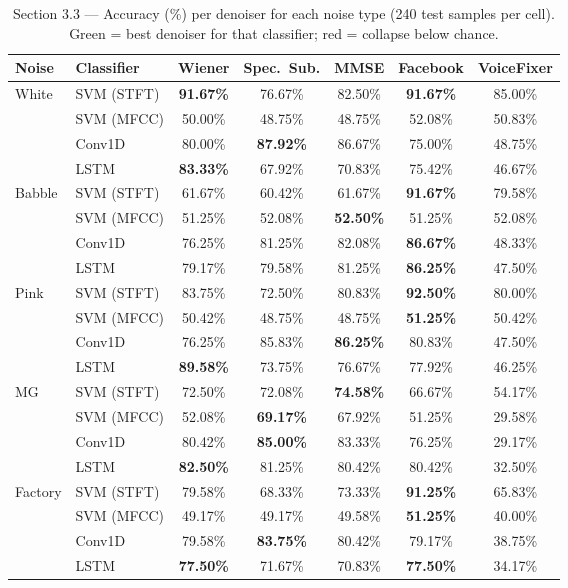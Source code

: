 \documentclass[12pt,a4paper,onecolumn]{exam}
\newcommand{\best}[1]{\cellcolor{bestcol}\textbf{#1}}
\newcommand{\bad}[1]{\cellcolor{warnred}#1}
\begin{document}
\begin{table}[H]
\centering
\caption{Section 3.3 --- Accuracy (\%) per denoiser for each noise type (240 test samples per cell).
Green = best denoiser for that classifier; red = collapse below chance.}
\label{tab:33_acc}
\small
\setlength{\tabcolsep}{5pt}
\begin{tabular}{llccccc}
\toprule
\textbf{Noise} & \textbf{Classifier} & \textbf{Wiener} & \textbf{Spec.\ Sub.} & \textbf{MMSE} & \textbf{Facebook} & \textbf{VoiceFixer} \\
\midrule
\multirow{4}{*}{White}
 & SVM (STFT) & \best{91.67\%} & 76.67\% & 82.50\% & \best{91.67\%} & 85.00\% \\
 & SVM (MFCC) & 50.00\%        & 48.75\% & 48.75\% & 52.08\% & 50.83\% \\
 & Conv1D     & 80.00\%        & \best{87.92\%} & 86.67\% & 75.00\% & \bad{48.75\%} \\
 & LSTM       & \best{83.33\%} & 67.92\% & 70.83\% & 75.42\% & \bad{46.67\%} \\
\midrule
\multirow{4}{*}{Babble}
 & SVM (STFT) & 61.67\% & 60.42\% & 61.67\% & \best{91.67\%} & 79.58\% \\
 & SVM (MFCC) & 51.25\% & 52.08\% & \best{52.50\%} & 51.25\% & 52.08\% \\
 & Conv1D     & 76.25\% & 81.25\% & 82.08\% & \best{86.67\%} & \bad{48.33\%} \\
 & LSTM       & 79.17\% & 79.58\% & 81.25\% & \best{86.25\%} & \bad{47.50\%} \\
\midrule
\multirow{4}{*}{Pink}
 & SVM (STFT) & 83.75\% & 72.50\% & 80.83\% & \best{92.50\%} & 80.00\% \\
 & SVM (MFCC) & 50.42\% & 48.75\% & 48.75\% & \best{51.25\%} & 50.42\% \\
 & Conv1D     & 76.25\% & 85.83\% & \best{86.25\%} & 80.83\% & \bad{47.50\%} \\
 & LSTM       & \best{89.58\%} & 73.75\% & 76.67\% & 77.92\% & \bad{46.25\%} \\
\midrule
\multirow{4}{*}{MG}
 & SVM (STFT) & 72.50\% & 72.08\% & \best{74.58\%} & 66.67\% & \bad{54.17\%} \\
 & SVM (MFCC) & 52.08\% & \best{69.17\%} & 67.92\% & 51.25\% & \bad{29.58\%} \\
 & Conv1D     & 80.42\% & \best{85.00\%} & 83.33\% & 76.25\% & \bad{29.17\%} \\
 & LSTM       & \best{82.50\%} & 81.25\% & 80.42\% & 80.42\% & \bad{32.50\%} \\
\midrule
\multirow{4}{*}{Factory}
 & SVM (STFT) & 79.58\% & 68.33\% & 73.33\% & \best{91.25\%} & 65.83\% \\
 & SVM (MFCC) & 49.17\% & 49.17\% & 49.58\% & \best{51.25\%} & \bad{40.00\%} \\
 & Conv1D     & 79.58\% & \best{83.75\%} & 80.42\% & 79.17\% & \bad{38.75\%} \\
 & LSTM       & \best{77.50\%} & 71.67\% & 70.83\% & \best{77.50\%} & \bad{34.17\%} \\
\bottomrule
\end{tabular}
\end{table}
\end{document}
